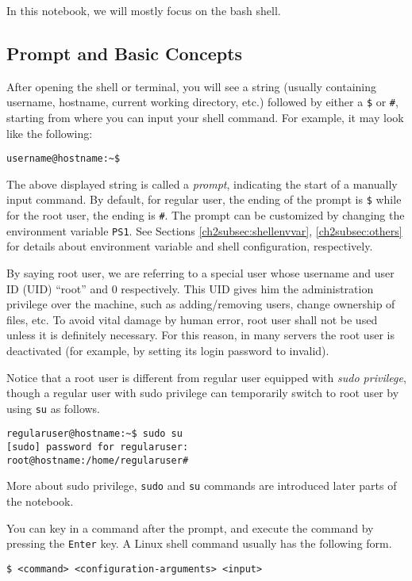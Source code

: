 In this notebook, we will mostly focus on the bash shell.

\subsection{Prompt and Basic Concepts}

After opening the shell or terminal, you will see a string (usually containing username, hostname, current working directory, etc.) followed by either a \verb|$| or \verb|#|, starting from where you can input your shell command. For example, it may look like the following:
\begin{verbatim}
username@hostname:~$
\end{verbatim}

The above displayed string is called a \textit{prompt}, indicating the start of a manually input command. By default, for regular user, the ending of the prompt is \verb|$| while for the root user, the ending is \verb|#|. The prompt can be customized by changing the environment variable \verb|PS1|. See Sections \ref{ch2subsec:shellenvvar}, \ref{ch2subsec:others} for details about environment variable and shell configuration, respectively.

By saying root user, we are referring to a special user whose username and user ID (UID) ``root'' and $0$ respectively. This UID gives him the administration privilege over the machine, such as adding/removing users, change ownership of files, etc. To avoid vital damage by human error, root user shall not be used unless it is definitely necessary. For this reason, in many servers the root user is deactivated (for example, by setting its login password to invalid).

Notice that a root user is different from regular user equipped with \textit{sudo privilege}, though a regular user with sudo privilege can temporarily switch to root user by using \verb|su| as follows.
\begin{verbatim}
regularuser@hostname:~$ sudo su
[sudo] password for regularuser:
root@hostname:/home/regularuser#
\end{verbatim}

More about sudo privilege, \verb|sudo| and \verb|su| commands are introduced later parts of the notebook.

You can key in a command after the prompt, and execute the command by pressing the \verb|Enter| key. A Linux shell command usually has the following form.
\begin{verbatim}
$ <command> <configuration-arguments> <input>
\end{verbatim}

